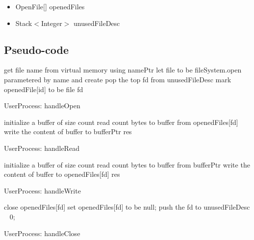 \documentclass[a4paper,10pt]{article}
\begin{document}
\begin{itemize}
\item OpenFile[] openedFiles
\item Stack$<$Integer$>$ unusedFileDesc
\end{itemize}

\subsection{Pseudo-code}

\begin{algorithm}
\DontPrintSemicolon
{}
get file name from virtual memory using namePtr\;
let file to be fileSystem.open parametered by name and create\;
pop the top fd from unusedFileDesc\;
mark openedFile[id] to be file\;
\Return fd
\caption{UserProcess: handleOpen}
\label{algo:open}
\end{algorithm}

\begin{algorithm}
\DontPrintSemicolon
{}
initialize a buffer of size count\;
read count bytes to buffer from openedFiles[fd]\;
write the content of buffer to bufferPtr\;
\Return res
\caption{UserProcess: handleRead}
\label{algo:read}
\end{algorithm}

\begin{algorithm}
\DontPrintSemicolon
{}
initialize a buffer of size count\;
read count bytes to buffer from bufferPtr\;
write the content of buffer to openedFiles[fd]\;
\Return res
\caption{UserProcess: handleWrite}
\label{algo:write}
\end{algorithm}

\begin{algorithm}
\DontPrintSemicolon
{}
close openedFiles[fd]\;
set openedFiles[fd] to be null;
push the fd to unusedFileDesc\;
\Return~ 0;
\caption{UserProcess: handleClose}
\label{algo:close}
\end{algorithm}
\end{document}
